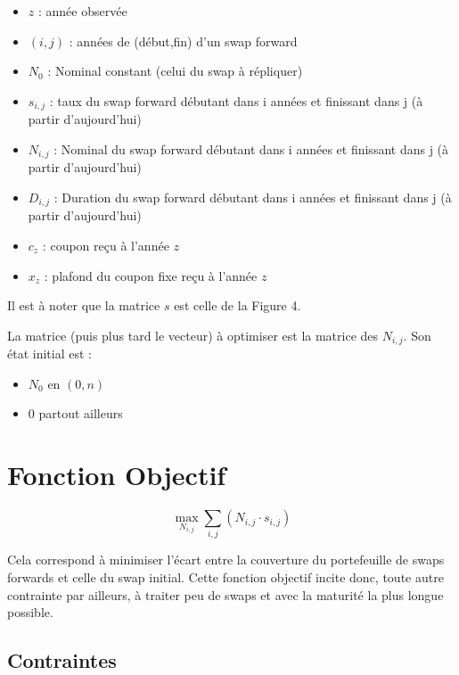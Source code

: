 \documentclass[11pt,a4paper]{report}
\begin{document}
\begin{itemize}\itemsep2pt
    \item $z$ : année observée
    \item $( i , j )$ : années de (début,fin) d'un swap forward
    \item $N_0$ : Nominal constant (celui du swap à répliquer)
    \item $s_{i,j}$ : taux du swap forward débutant dans i années et finissant dans j (à partir d'aujourd'hui)
    \item $N_{i,j}$ : Nominal du swap forward débutant dans i années et finissant dans j (à partir d'aujourd'hui)
    \item $D_{i,j}$ : Duration du swap forward débutant dans i années et finissant dans j (à partir d'aujourd'hui)
    \item $c_z$ : coupon reçu à l'année $z$
    \item $x_z$ : plafond du coupon fixe reçu à l'année $z$
\end{itemize}

Il est à noter que la matrice $s$ est celle de la Figure 4. 

La matrice (puis plus tard le vecteur) à optimiser est la matrice des $N_{i,j}$. Son état initial est :  
\begin{itemize}\itemsep2pt
    \item $N_0$ en $(0,n) $
    \item 0 partout ailleurs
\end{itemize}


\section{Fonction Objectif}



\[ \max_{N_{i,j}}  \sum_{i,j} ( N_{i,j} \cdot  s_{i,j} )  \]


Cela correspond à minimiser l'écart entre la couverture du portefeuille de swaps forwards et celle du swap initial.  Cette fonction objectif incite donc, toute autre contrainte par ailleurs, à  traiter peu de swaps et avec la maturité la plus longue possible.

\subsection{Contraintes}
\end{document}
